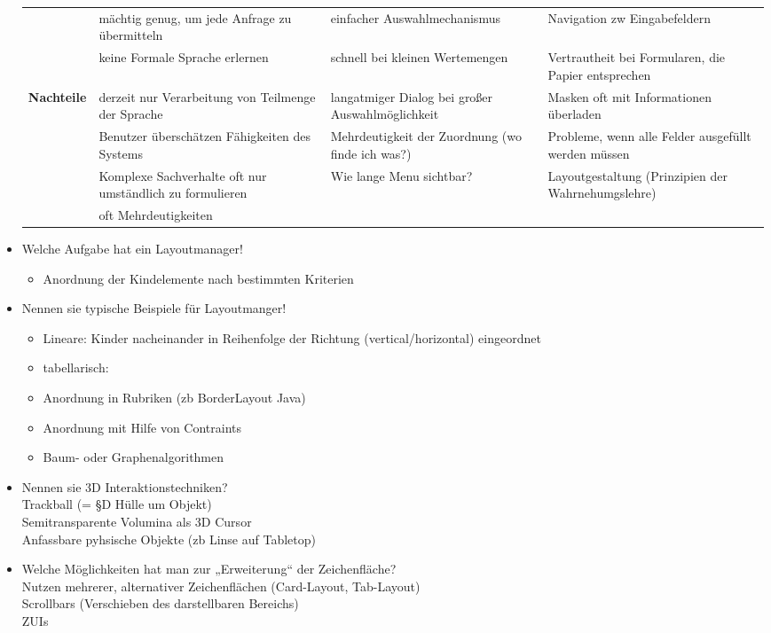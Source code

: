 \begin{itemize}
\begin{table}[!h]
\begin{tabular}{|l|p{13em}|p{13em}|p{13em}|}
			& mächtig genug, um jede Anfrage zu übermitteln & einfacher Auswahlmechanismus & Navigation zw Eingabefeldern\\
			& keine Formale Sprache erlernen &schnell bei kleinen Wertemengen& Vertrautheit bei Formularen, die Papier entsprechen\\
			\hline
			\textbf{Nachteile} & derzeit nur Verarbeitung von Teilmenge der Sprache & langatmiger Dialog bei großer Auswahlmöglichkeit& Masken oft mit Informationen überladen\\
			& Benutzer überschätzen Fähigkeiten des Systems &Mehrdeutigkeit der Zuordnung (wo finde ich was?)& Probleme, wenn alle Felder ausgefüllt werden müssen\\
			& Komplexe Sachverhalte oft nur umständlich zu formulieren &Wie lange Menu sichtbar?& Layoutgestaltung (Prinzipien der Wahrnehumgslehre)\\
			& oft Mehrdeutigkeiten && \\
			\hline
		\end{tabular}
	\end{table}
	\item Welche Aufgabe hat ein Layoutmanager!
	\begin{itemize}
		\item Anordnung der Kindelemente nach bestimmten Kriterien
	\end{itemize}
	\item Nennen sie typische Beispiele für Layoutmanger!
	\begin{itemize}
		\item Lineare: Kinder nacheinander in Reihenfolge der Richtung (vertical/horizontal) eingeordnet
		\item tabellarisch: 
		\item Anordnung in Rubriken (zb BorderLayout Java)
		\item Anordnung mit Hilfe von Contraints
		\item Baum- oder Graphenalgorithmen
	\end{itemize}
	
	\item Nennen sie 3D Interaktionstechniken?\\
	Trackball (= §D Hülle um Objekt)\\
	Semitransparente Volumina als 3D Cursor\\
	Anfassbare pyhsische Objekte (zb Linse auf Tabletop)
	
	\item Welche Möglichkeiten hat man zur „Erweiterung“ der Zeichenfläche?\\
	Nutzen mehrerer, alternativer Zeichenflächen (Card-Layout, Tab-Layout)\\
	Scrollbars (Verschieben des darstellbaren Bereichs)\\
	ZUIs
	

\end{itemize}
